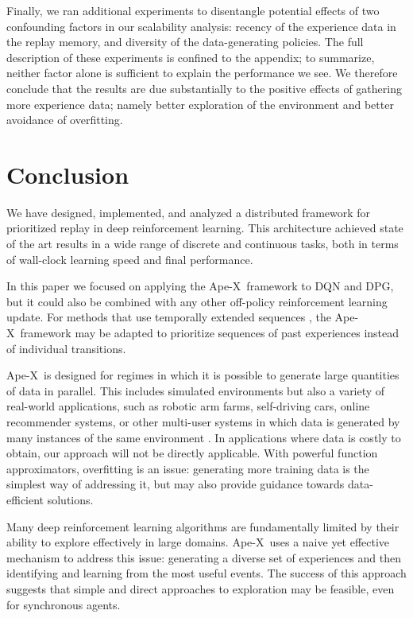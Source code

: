 \documentclass{article} %
\def\apex{Ape-X}
\begin{document}
Finally, we ran additional experiments to disentangle potential effects of two confounding factors in our scalability analysis: recency of the experience data in the replay memory, and diversity of the data-generating policies. The full description of these experiments is confined to the appendix; to summarize, neither factor alone is sufficient to explain the performance we see. We therefore conclude that the results are due substantially to the positive effects of gathering more experience data; namely better exploration of the environment and better avoidance of overfitting.

\section{Conclusion}

We have designed, implemented, and analyzed a distributed framework for prioritized replay in deep reinforcement learning. This architecture achieved state of the art results in a wide range of discrete and continuous tasks, both in terms of wall-clock learning speed and final performance. 

In this paper we focused on applying the \apex\ framework to DQN and DPG, but it could also be combined with any other off-policy reinforcement learning update. For methods that use temporally extended sequences \citep[e.g., ][]{a3c, acer}, the \apex\ framework may be adapted to prioritize sequences of past experiences instead of individual transitions.

\apex\ is designed for regimes in which it is possible to generate large quantities of data in parallel. This includes simulated environments but also a variety of real-world applications, such as robotic arm farms, self-driving cars, online recommender systems, or other multi-user systems in which data is generated by many instances of the same environment \citep[c.f.][]{concurrent-rl}. In applications where data is costly to obtain, our approach will not be directly applicable. With powerful function approximators, overfitting is an issue: generating more training data is the simplest way of addressing it, but may also provide guidance towards data-efficient solutions. 

Many deep reinforcement learning algorithms are fundamentally limited by their ability to explore effectively in large domains. \apex\ uses a naive yet effective mechanism to address this issue: generating a diverse set of experiences and then identifying and learning from the most useful events. The success of this approach suggests that simple and direct approaches to exploration may be feasible, even for synchronous agents.
\end{document}
